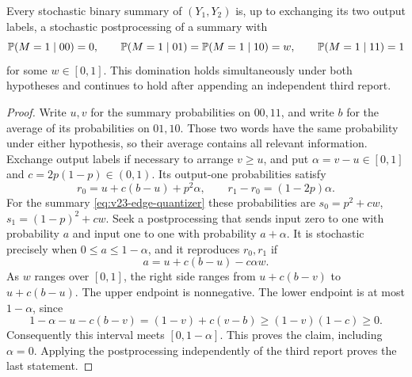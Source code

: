 \begin{lemma}
\label{lem:v23-domination}
Every stochastic binary summary of $(Y_1,Y_2)$ is, up to exchanging its
two output labels, a stochastic postprocessing of a summary with
\begin{equation}\label{eq:v23-edge-quantizer}
 \mathbb P(M=1\mid 00)=0,\qquad
 \mathbb P(M=1\mid 01)=\mathbb P(M=1\mid 10)=w,\qquad
 \mathbb P(M=1\mid 11)=1
\end{equation}
for some $w\in[0,1]$. This domination holds simultaneously under both
hypotheses and continues to hold after appending an independent third
report.
\end{lemma}
\begin{proof}
Write $u,v$ for the summary probabilities on $00,11$, and write $b$
for the average of its probabilities on $01,10$. Those two words
have the same probability under either hypothesis, so their average
contains all relevant information. Exchange output labels if necessary
to arrange $v\ge u$, and put $\alpha=v-u\in[0,1]$ and
$c=2p(1-p)\in(0,1)$. Its output-one probabilities satisfy
\[
 r_0=u+c(b-u)+p^2\alpha,
 \qquad r_1-r_0=(1-2p)\alpha.
\]
For the summary \eqref{eq:v23-edge-quantizer} these probabilities are
$s_0=p^2+cw$, $s_1=(1-p)^2+cw$. Seek a postprocessing that sends input
zero to one with probability $a$ and input one to one with probability
$a+\alpha$. It is stochastic precisely when $0\le a\le1-\alpha$,
and it reproduces $r_0,r_1$ if
\[
 a=u+c(b-u)-c\alpha w.
\]
As $w$ ranges over $[0,1]$, the right side ranges from
$u+c(b-v)$ to $u+c(b-u)$. The upper endpoint is nonnegative. The lower
endpoint is at most $1-\alpha$, since
\[
 1-\alpha-u-c(b-v)=(1-v)+c(v-b)
                           \ge(1-v)(1-c)\ge0.
\]
Consequently this interval meets $[0,1-\alpha]$. This proves the
claim, including $\alpha=0$. Applying the postprocessing independently
of the third report proves the last statement.
\end{proof}

